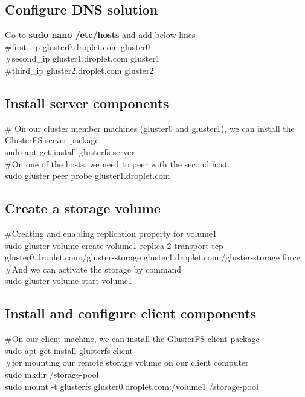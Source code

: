 \documentclass[12pt]{report}
\begin{document}
\subsection{Configure DNS solution}
Go to \textbf{sudo nano /etc/hosts} and add below lines\\
\#first\_ip gluster0.droplet.com gluster0\\
\#second\_ip gluster1.droplet.com gluster1\\
\#third\_ip gluster2.droplet.com gluster2\\

\subsection{Install server components}
\# On our cluster member machines (gluster0 and gluster1), we can install the GlusterFS server package\\
sudo apt-get install glusterfs-server\\
\#On one of the hosts, we need to peer with the second host. \\ 
sudo gluster peer probe gluster1.droplet.com\\
\subsection{Create a storage volume}
\#Creating and enabling replication property for volume1\\
sudo gluster volume create volume1 replica 2 transport tcp gluster0.droplet.com:/gluster-storage gluster1.droplet.com:/gluster-storage force\\
\#And we can activate the storage by command\\
sudo gluster volume start volume1\\
\subsection{Install and configure client components}
\#On our client machine, we can install the GlusterFS client package\\
sudo apt-get install glusterfs-client\\
\#for mounting our remote storage volume on our client computer\\
sudo mkdir /storage-pool\\
sudo mount -t glusterfs gluster0.droplet.com:/volume1 /storage-pool\\
\end{document}
